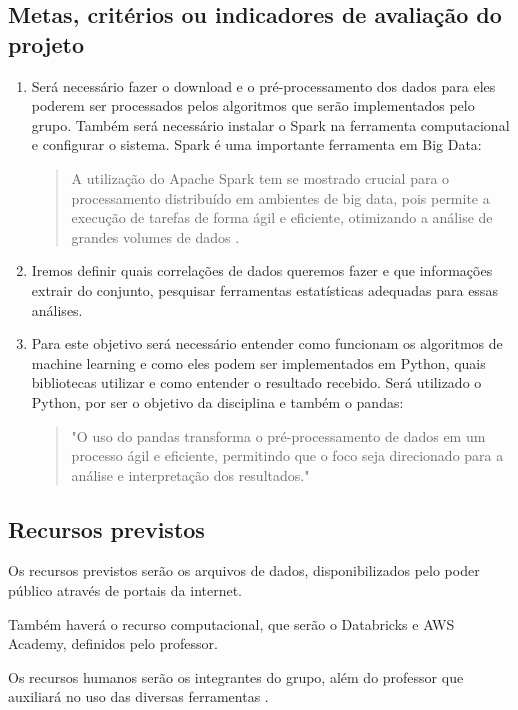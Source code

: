 \documentclass{article}
\begin{document}
\subsection{Metas, critérios ou indicadores de avaliação do projeto}

\begin{enumerate}
    \item Será necessário fazer o download e o pré-processamento dos dados para eles poderem ser processados pelos algoritmos que serão implementados pelo grupo. Também será necessário instalar o Spark na ferramenta computacional e configurar o sistema. Spark é uma importante ferramenta em Big Data: \begin{quote}A utilização do Apache Spark tem se mostrado crucial para o processamento distribuído em ambientes de big data, pois permite a execução de tarefas de forma ágil e eficiente, otimizando a análise de grandes volumes de dados \cite{Zaharia2016}.
\end{quote}
    
    \item Iremos definir quais correlações de dados queremos fazer e que informações extrair do conjunto, pesquisar ferramentas estatísticas adequadas para essas análises.
    
    \item Para este objetivo será necessário entender como funcionam os algoritmos de machine learning e como eles podem ser implementados em Python, quais bibliotecas utilizar e como entender o resultado recebido. Será utilizado o Python, por ser o objetivo da disciplina e também o pandas: \begin{quote}
"O uso do pandas transforma o pré-processamento de dados em um processo ágil e eficiente, permitindo que o foco seja direcionado para a análise e interpretação dos resultados." \cite{mckinney2017python}
\end{quote}
\end{enumerate}

\subsection{Recursos previstos}
Os recursos previstos serão os arquivos de dados, disponibilizados pelo poder público através de portais da internet.

Também haverá o recurso computacional, que serão o Databricks \cite{Databricks2021} e AWS Academy, definidos pelo professor.

Os recursos humanos serão os integrantes do grupo, além do professor que auxiliará no uso das diversas ferramentas \cite{Marler2017}.
\end{document}
